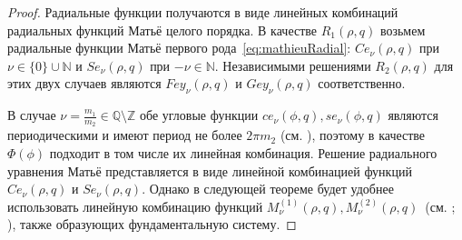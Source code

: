 \begin{proof}
Радиальные функции получаются в виде линейных комбинаций радиальных функций Матьё целого порядка. В качестве $R_1(\rho, q)$ возьмем радиальные функции Матьё первого рода~\ref{eq:mathieuRadial}: $Ce_\nu(\rho, q)$ при $\nu \in \{0\} \cup \mathbb{N}$ и $Se_\nu(\rho, q)$ при $-\nu \in \mathbb{N}$. Независимыми решениями $R_2(\rho, q)$ для этих двух случаев являются $Fey_\nu(\rho, q)$ и $Gey_\nu(\rho, q)$ соответственно.

В случае $\nu = \frac{m_1}{m_2} \in \mathbb{Q} \setminus \mathbb{Z}$ обе угловые функции $ce_\nu(\phi, q), se_\nu(\phi, q)$  являются периодическими и имеют период не более $2\pi m_2$ (см. \cite{wref2}), поэтому в качестве $\Phi(\phi)$ подходит в том числе их линейная комбинация. Решение радиального уравнения Матьё представляется в виде линейной комбинацией функций $Ce_\nu(\rho, q)$ и $Se_\nu(\rho, q)$. Однако в следующей теореме  будет удобнее использовать линейную комбинацию функций $M_\nu^{(1)}(\rho, q), M_\nu^{(2)}(\rho, q)$~(см. \cite[\S\ 28.23]{wref5}; \cite[гл.~2, \S\ 2.4, с.~165]{wref12}), также образующих фундаментальную систему.
\end{proof}
\FloatBarrier
